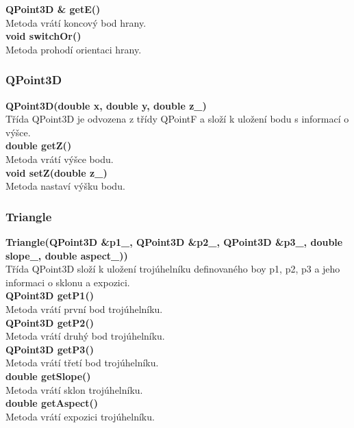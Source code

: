 \documentclass[a4paper, 12pt]{article}
\begin{document}
\textbf{QPoint3D \& getE()}\\
Metoda vrátí koncový bod hrany.\\

\textbf{void switchOr()}\\
Metoda prohodí orientaci hrany.\\

\subsubsection{QPoint3D}
\textbf{QPoint3D(double x, double y, double z\_)}\\
Třída QPoint3D je odvozena z třídy QPointF a složí k uložení bodu s informací o výšce.\\

\textbf{double getZ()}\\
Metoda vrátí výšce bodu.\\

\textbf{void setZ(double z\_)}\\
Metoda nastaví výšku bodu.\\

\subsubsection{Triangle}
\textbf{Triangle(QPoint3D \&p1\_, QPoint3D \&p2\_, QPoint3D \&p3\_, double slope\_, double aspect\_))}\\
Třída QPoint3D složí k uložení trojúhelníku definovaného boy p1, p2, p3 a jeho informaci o sklonu a expozici.\\

\textbf{ QPoint3D getP1()}\\
Metoda vrátí první bod trojúhelníku.\\

\textbf{ QPoint3D getP2()}\\
Metoda vrátí druhý bod trojúhelníku.\\

\textbf{ QPoint3D getP3()}\\
Metoda vrátí třetí bod trojúhelníku.\\

\textbf{double getSlope()}\\
Metoda vrátí sklon trojúhelníku.\\

\textbf{double getAspect()}\\
Metoda vrátí expozici trojúhelníku.\\
\end{document}
